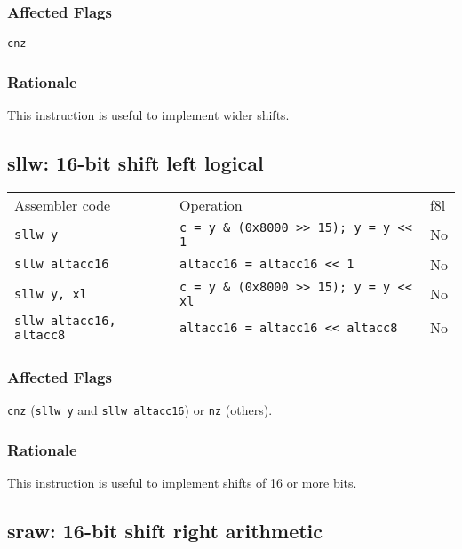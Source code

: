 \documentclass{book}
\begin{document}
\subsubsection*{Affected Flags}

\texttt{cnz}

\subsubsection*{Rationale}

This instruction is useful to implement wider shifts.


\subsection{sllw: 16-bit shift left logical}

\begin{tabular}{l l l}
Assembler code                  & Operation                                     & f8l \\
\texttt{sllw y}                 & \texttt{c = y \& (0x8000 >> 15); y = y << 1}  & No \\
\texttt{sllw altacc16}          & \texttt{altacc16 = altacc16 << 1}             & No \\
\texttt{sllw y, xl}             & \texttt{c = y \& (0x8000 >> 15); y = y << xl} & No \\
\texttt{sllw altacc16, altacc8} & \texttt{altacc16 = altacc16 << altacc8}       & No \\
\end{tabular}

\subsubsection*{Affected Flags}

\texttt{cnz} (\texttt{sllw y} and \texttt{sllw altacc16}) or \texttt{nz} (others).

\subsubsection*{Rationale}

This instruction is useful to implement shifts of 16 or more bits.


\subsection{sraw: 16-bit shift right arithmetic}
\end{document}
